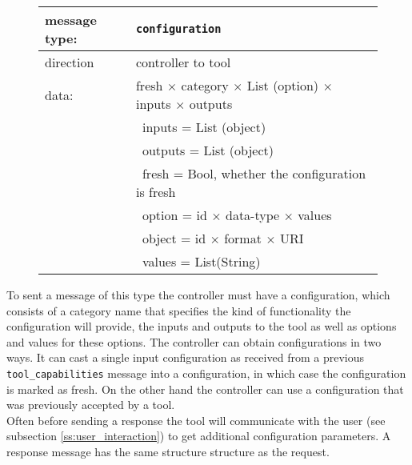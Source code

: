 \documentclass{article}
\newcommand{\msg}[1]{\texttt{#1}}
\begin{document}
   \begin{figure}[H]
    \begin{tabular}{|ll|}
     \hline
      message type:   & \msg{configuration} \\
     \hline
      direction       & controller to tool \\
      data:           & fresh $\times$ category $\times$ List (option) $\times$ inputs $\times$ outputs \\
                      & \ inputs  = List (object) \\
                      & \ outputs = List (object) \\
                      & \ fresh   = Bool, whether the configuration is fresh \\
                      & \ option  = id $\times$ data-type $\times$ values \\
                      & \ object  = id $\times$ format $\times$ URI \\
                      & \ values  = List(String) \\
     \hline
    \end{tabular}
   \end{figure}

   \noindent To sent a message of this type the controller must have a
   configuration, which consists of a category name that specifies the kind of
   functionality the configuration will provide, the inputs and outputs to the
   tool as well as options and values for these options. The controller can
   obtain configurations in two ways. It can cast a single input configuration as
   received from a previous \msg{tool\_capabilities} message into a
   configuration, in which case the configuration is marked as fresh. On the
   other hand the controller can use a configuration that was previously
   accepted by a tool.
   \\[4pt]
   Often before sending a response the tool will communicate with the user (see
   subsection \ref{ss:user_interaction}) to get additional configuration
   parameters. A response message has the same structure structure as the request. 
\end{document}
